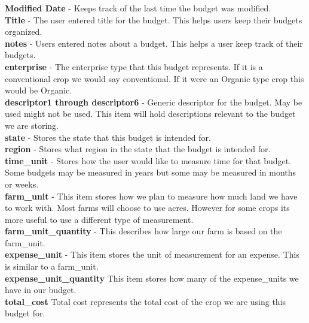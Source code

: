 \documentclass[onecolumn, draftclsnofoot,10pt, compsoc]{article}
\begin{document}
				\textbf{Modified Date} - Keeps track of the last time the budget was modified.\\
				
				\textbf{Title} - The user entered title for the budget. This helps users keep their budgets organized.\\
				
				\textbf{notes} - Users entered notes about a budget. This helps a user keep track of their budgets.\\
				
				\textbf{enterprise} - The enterprise type that this budget represents. If it is a conventional crop we would say conventional. If it were an Organic type crop this would be Organic.\\
				
				\textbf{descriptor1 through descriptor6} - Generic descriptor for the budget. May be used might not be used. This item will hold descriptions relevant to the budget we are storing.\\
				
				\textbf{state} - Stores the state that this budget is intended for.\\
				
				\textbf{region} - Stores what region in the state that the budget is intended for.\\
				
				\textbf{time\_unit} - Stores how the user would like to measure time for that budget. Some budgets may be measured in years but some may be measured in months or weeks.\\
				
				\textbf{farm\_unit} - This item stores how we plan to measure how much land we have to work with. Most farms will choose to use acres. However for some crops its more useful to use a different type of measurement.\\
				
				\textbf{farm\_unit\_quantity} - This describes how large our farm is based on the farm\_unit.\\
				
				\textbf{expense\_unit} - This item stores the unit of measurement for an expense. This is similar to a farm\_unit.\\
				
				\textbf{expense\_unit\_quantity} \- This item stores how many of the expense\_units we have in our budget.\\
				
				\textbf{total\_cost} \- Total cost represents the total cost of the crop we are using this budget for.\\
				
\end{document}
